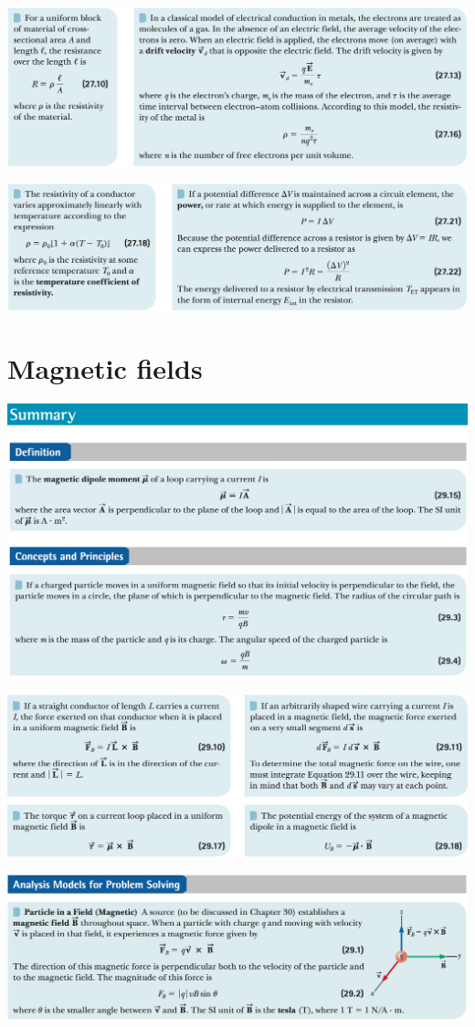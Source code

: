 \documentclass[12pt,a4paper]{article}
\newcommand{\N}{\noindent}
\begin{document}
		\vspace{2mm}
		\N \includegraphics[scale=.42]{5_c.png}
		
		\vspace{2mm}
		\N \includegraphics[scale=.42]{5_d.png}
		
	\section{Magnetic fields}
		\N \includegraphics[scale=.42]{6_a.png}
		
		\vspace{2mm}
		\N \includegraphics[scale=.42]{6_b.png}
		
		\vspace{2mm}
		\N \includegraphics[scale=.42]{6_c.png}
\end{document}
